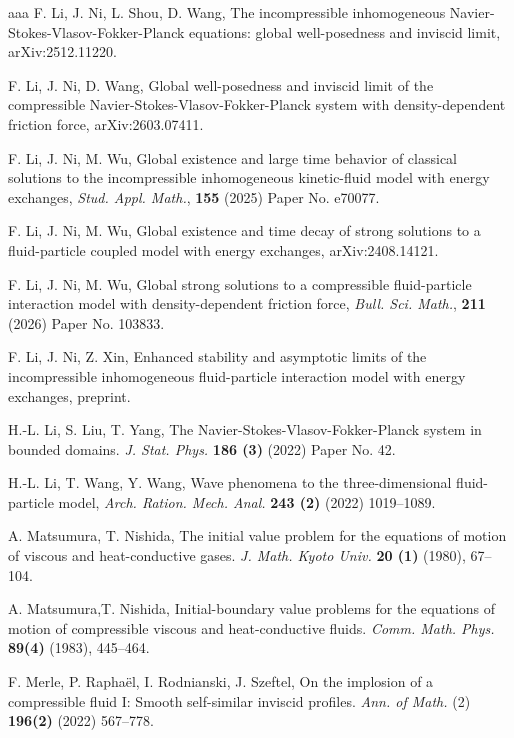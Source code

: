 \documentclass[reqno,11pt]{amsart}
\theoremstyle{plain}
\numberwithin{equation}{section}
\begin{document}
\begin{thebibliography}{aaa}
 F. Li, J. Ni, L. Shou, D. Wang, The incompressible inhomogeneous Navier-Stokes-Vlasov-Fokker-Planck equations: global well-posedness and inviscid limit, arXiv:2512.11220. 

   F. Li, J. Ni, D. Wang,
Global well-posedness and inviscid limit of the compressible Navier-Stokes-Vlasov-Fokker-Planck system with density-dependent friction force, arXiv:2603.07411. 


   F. Li, J. Ni, M. Wu,
Global existence and large time behavior of classical
solutions to the incompressible inhomogeneous
kinetic-fluid model with energy exchanges, {\it Stud. Appl. Math.},   {\bf 155} (2025) Paper No. e70077.



 F. Li, J. Ni, M. Wu,
Global existence and time decay of strong solutions to a fluid-particle coupled model with energy exchanges,
arXiv:2408.14121.


 F. Li, J. Ni, M. Wu,
Global strong solutions to a compressible fluid-particle interaction model with density-dependent friction force,
 {\it Bull. Sci. Math.},  {\bf 211} (2026) Paper No. 103833.
 
   F. Li, J. Ni, Z. Xin, {Enhanced stability  and asymptotic limits of the incompressible inhomogeneous  fluid-particle interaction model  with energy exchanges}, preprint.  
 
 
 H.-L. Li, S. Liu, T.  Yang,   The Navier-Stokes-Vlasov-Fokker-Planck system in bounded domains.
{\it J. Stat. Phys.} \textbf{186 (3)} (2022)  Paper No. 42.

 H.-L. Li, T. Wang, Y. Wang,
Wave phenomena to the three-dimensional fluid-particle model,
{\it Arch. Ration. Mech. Anal.} {\bf 243 (2)} (2022) 1019--1089.

 A.  Matsumura, T.  Nishida,  The initial value problem for the equations of motion of viscous and heat-conductive gases. {\it J. Math. Kyoto Univ.}   {\bf 20 (1)} (1980),   67--104. 

 A. Matsumura,T.  Nishida,   Initial-boundary value problems for the equations of motion of compressible viscous and heat-conductive fluids. {\it Comm. Math. Phys.} {\bf  89(4)}  (1983), 445--464.  



 F. Merle, P.  Rapha\"{e}l, I.  Rodnianski, J. Szeftel, 
On the implosion of a compressible fluid I: Smooth self-similar inviscid profiles.  
{\it Ann. of Math.}  (2) \textbf{196(2)} (2022)  567–778. 



\end{thebibliography}
\end{document}
